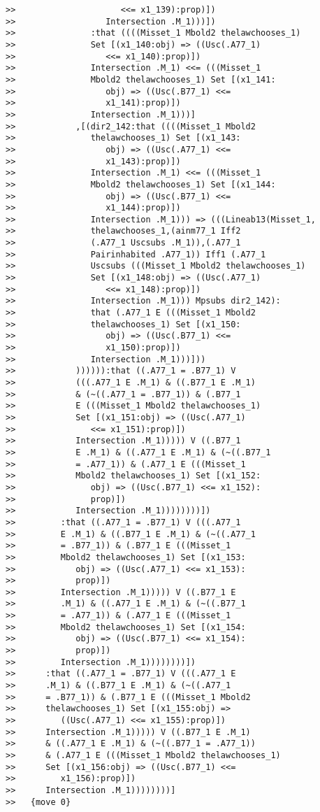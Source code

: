 \documentclass[12pt]{article}
\begin{document}
\begin{verbatim}
>>                     <<= x1_139):prop)])
>>                  Intersection .M_1)))])
>>               :that ((((Misset_1 Mbold2 thelawchooses_1)
>>               Set [(x1_140:obj) => ((Usc(.A77_1)
>>                  <<= x1_140):prop)])
>>               Intersection .M_1) <<= (((Misset_1
>>               Mbold2 thelawchooses_1) Set [(x1_141:
>>                  obj) => ((Usc(.B77_1) <<=
>>                  x1_141):prop)])
>>               Intersection .M_1)))]
>>            ,[(dir2_142:that ((((Misset_1 Mbold2
>>               thelawchooses_1) Set [(x1_143:
>>                  obj) => ((Usc(.A77_1) <<=
>>                  x1_143):prop)])
>>               Intersection .M_1) <<= (((Misset_1
>>               Mbold2 thelawchooses_1) Set [(x1_144:
>>                  obj) => ((Usc(.B77_1) <<=
>>                  x1_144):prop)])
>>               Intersection .M_1))) => (((Lineab13(Misset_1,
>>               thelawchooses_1,(ainm77_1 Iff2
>>               (.A77_1 Uscsubs .M_1)),(.A77_1
>>               Pairinhabited .A77_1)) Iff1 (.A77_1
>>               Uscsubs (((Misset_1 Mbold2 thelawchooses_1)
>>               Set [(x1_148:obj) => ((Usc(.A77_1)
>>                  <<= x1_148):prop)])
>>               Intersection .M_1))) Mpsubs dir2_142):
>>               that (.A77_1 E (((Misset_1 Mbold2
>>               thelawchooses_1) Set [(x1_150:
>>                  obj) => ((Usc(.B77_1) <<=
>>                  x1_150):prop)])
>>               Intersection .M_1)))]))
>>            )))))):that ((.A77_1 = .B77_1) V
>>            (((.A77_1 E .M_1) & ((.B77_1 E .M_1)
>>            & (~((.A77_1 = .B77_1)) & (.B77_1
>>            E (((Misset_1 Mbold2 thelawchooses_1)
>>            Set [(x1_151:obj) => ((Usc(.A77_1)
>>               <<= x1_151):prop)])
>>            Intersection .M_1))))) V ((.B77_1
>>            E .M_1) & ((.A77_1 E .M_1) & (~((.B77_1
>>            = .A77_1)) & (.A77_1 E (((Misset_1
>>            Mbold2 thelawchooses_1) Set [(x1_152:
>>               obj) => ((Usc(.B77_1) <<= x1_152):
>>               prop)])
>>            Intersection .M_1))))))))])
>>         :that ((.A77_1 = .B77_1) V (((.A77_1
>>         E .M_1) & ((.B77_1 E .M_1) & (~((.A77_1
>>         = .B77_1)) & (.B77_1 E (((Misset_1
>>         Mbold2 thelawchooses_1) Set [(x1_153:
>>            obj) => ((Usc(.A77_1) <<= x1_153):
>>            prop)])
>>         Intersection .M_1))))) V ((.B77_1 E
>>         .M_1) & ((.A77_1 E .M_1) & (~((.B77_1
>>         = .A77_1)) & (.A77_1 E (((Misset_1
>>         Mbold2 thelawchooses_1) Set [(x1_154:
>>            obj) => ((Usc(.B77_1) <<= x1_154):
>>            prop)])
>>         Intersection .M_1))))))))])
>>      :that ((.A77_1 = .B77_1) V (((.A77_1 E
>>      .M_1) & ((.B77_1 E .M_1) & (~((.A77_1
>>      = .B77_1)) & (.B77_1 E (((Misset_1 Mbold2
>>      thelawchooses_1) Set [(x1_155:obj) =>
>>         ((Usc(.A77_1) <<= x1_155):prop)])
>>      Intersection .M_1))))) V ((.B77_1 E .M_1)
>>      & ((.A77_1 E .M_1) & (~((.B77_1 = .A77_1))
>>      & (.A77_1 E (((Misset_1 Mbold2 thelawchooses_1)
>>      Set [(x1_156:obj) => ((Usc(.B77_1) <<=
>>         x1_156):prop)])
>>      Intersection .M_1))))))))]
>>   {move 0}




\end{verbatim}
\end{document}
